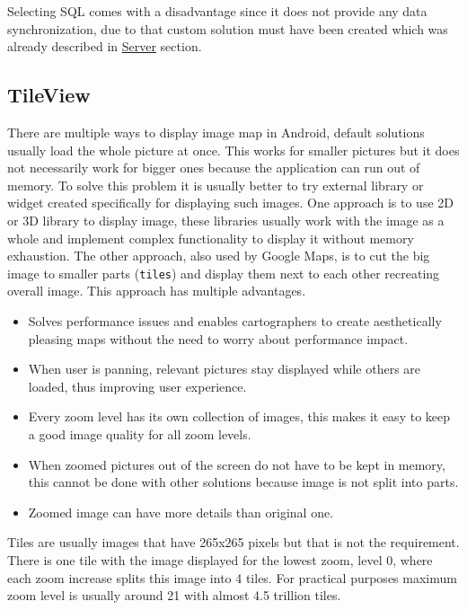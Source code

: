 Selecting SQL comes with a disadvantage since it does not provide any data synchronization, due to that custom solution must have been created which was already described in \hyperref[sec:Server]{Server} section.

\subsection{TileView}\label{subsec:TileView}
There are multiple ways to display image map in Android, default solutions usually load the whole picture at once. This works for smaller pictures but it does not necessarily work for bigger ones because the application can run out of memory. To solve this problem it is usually better to try external library or widget created specifically for displaying such images. One approach is to use 2D or 3D library to display image, these libraries usually work with the image as a whole and implement complex functionality to display it without memory exhaustion. The other approach, also used by Google Maps, is to cut the big image to smaller parts (\verb|tiles|) and display them next to each other recreating overall image. This approach has multiple advantages.

\begin{itemize}
	\item Solves performance issues and enables cartographers to create aesthetically pleasing maps without the need to worry about performance impact.
	\item When user is panning, relevant pictures stay displayed while others are loaded, thus improving user experience.
	\item Every zoom level has its own collection of images, this makes it easy to keep a good image quality for all zoom levels.
	\item When zoomed pictures out of the screen do not have to be kept in memory, this cannot be done with other solutions because image is not split into parts.
	\item Zoomed image can have more details than original one.
\end{itemize}

Tiles are usually images that have 265x265 pixels but that is not the requirement. There is one tile with the image displayed for the lowest zoom, level 0, where each zoom increase splits this image into 4 tiles. For practical purposes maximum zoom level is usually around 21 with almost 4.5 trillion tiles.


